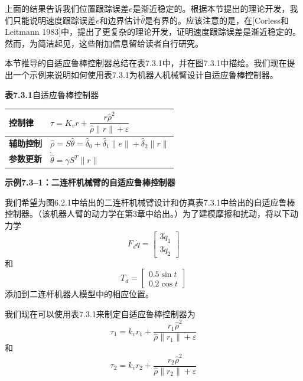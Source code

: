 \documentclass[UTF8]{ctexart}
\begin{document}
上面的结果告诉我们位置跟踪误差$e$是渐近稳定的。根据本节提出的理论开发，我们只能说明速度跟踪误差$\dot{e}$和边界估计$\hat{\theta}$是有界的。应该注意的是，在[Corless和Leitmann 1983]中，提出了更复杂的理论开发，证明速度跟踪误差是渐近稳定的。然而，为简洁起见，这些附加信息留给读者自行研究。

本节推导的自适应鲁棒控制器总结在表7.3.1中，并在图7.3.1中描绘。我们现在提出一个示例来说明如何使用表7.3.1为机器人机械臂设计自适应鲁棒控制器。

\textbf{表7.3.1}\quad 自适应鲁棒控制器

\begin{center}
\begin{tabular}{|l|l|}
\hline
\textbf{控制律} & $\tau = K_v r + \dfrac{r\hat{\rho}^2}{\hat{\rho}\|r\| + \varepsilon}$ \\
\hline
\textbf{辅助控制} & $\hat{\rho} = S\hat{\theta} = \hat{\delta}_0 + \hat{\delta}_1\|e\| + \hat{\delta}_2\|r\|$ \\
\hline
\textbf{参数更新} & $\dot{\hat{\theta}} = \gamma S^T\|r\|$ \\
\hline
\end{tabular}
\end{center}

\textbf{示例7.3--1：二连杆机械臂的自适应鲁棒控制器}

我们希望为图6.2.1中给出的二连杆机械臂设计和仿真表7.3.1中给出的自适应鲁棒控制器。（该机器人臂的动力学在第3章中给出。）为了建模摩擦和扰动，将以下动力学
\begin{equation}
F_d\dot{q} = \begin{bmatrix} 3\dot{q}_1 \\ 3\dot{q}_2 \end{bmatrix}
\end{equation}
和
\begin{equation}
T_d = \begin{bmatrix} 0.5\sin t \\ 0.2\cos t \end{bmatrix}
\end{equation}
添加到二连杆机器人模型中的相应位置。

我们现在可以使用表7.3.1来制定自适应鲁棒控制器为
\begin{equation}
\tau_1 = k_v r_1 + \frac{r_1\hat{\rho}^2}{\hat{\rho}\|r_1\| + \varepsilon}
\end{equation}
和
\begin{equation}
\tau_2 = k_v r_2 + \frac{r_2\hat{\rho}^2}{\hat{\rho}\|r_2\| + \varepsilon}
\end{equation}
\end{document}
